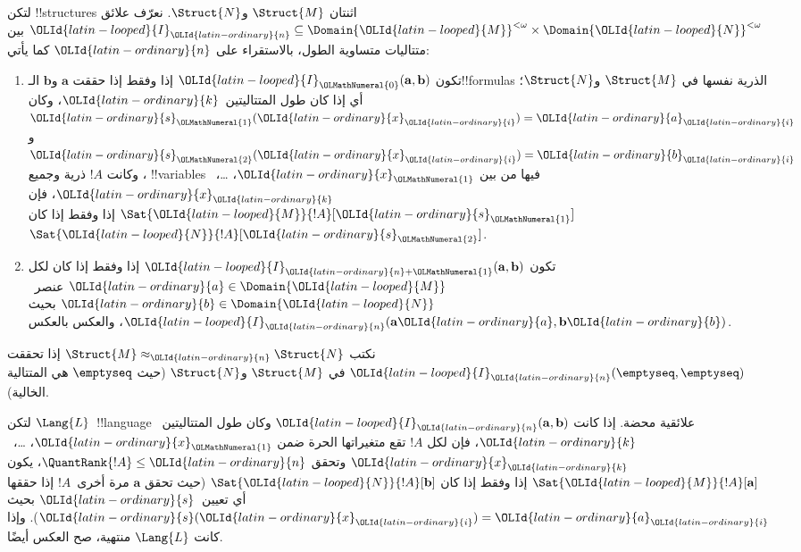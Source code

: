 \documentclass[../../../include/open-logic-section]{subfiles}
\begin{document}
\begin{defn}
  لتكن !!{structure}s اثنتان $\Struct{M}$ و$\Struct{N}$. نعرّف علائق
  ${\OLId{latin-looped}{I}}_{\OLId{latin-ordinary}{n}} \subseteq \Domain {\OLId{latin-looped}{M}}^{<\omega} \times \Domain {\OLId{latin-looped}{N}}^{<\omega}$ بين
  متتاليات متساوية الطول، بالاستقراء على ${\OLId{latin-ordinary}{n}}$ كما يأتي:
   \begin{enumerate}
   \item تكون ${\OLId{latin-looped}{I}}_{\OLMathNumeral{0}}(\mathbf{a},\mathbf{b})$ إذا وفقط إذا حققت
     $\mathbf{a}$ و$\mathbf{b}$ الـ!!{formula}s الذرية نفسها في
     $\Struct{M}$ و$\Struct{N}$؛ أي إذا كان طول المتتاليتين~${\OLId{latin-ordinary}{k}}$، وكان
     ${\OLId{latin-ordinary}{s}}_{\OLMathNumeral{1}}({\OLId{latin-ordinary}{x}}_{\OLId{latin-ordinary}{i}})={\OLId{latin-ordinary}{a}}_{\OLId{latin-ordinary}{i}}$ و${\OLId{latin-ordinary}{s}}_{\OLMathNumeral{2}}({\OLId{latin-ordinary}{x}}_{\OLId{latin-ordinary}{i}})={\OLId{latin-ordinary}{b}}_{\OLId{latin-ordinary}{i}}$، وكانت $!A$ ذرية وجميع
     !!{variable}s فيها من بين ${\OLId{latin-ordinary}{x}}_{\OLMathNumeral{1}}$، \dots،~${\OLId{latin-ordinary}{x}}_{\OLId{latin-ordinary}{k}}$، فإن
     $\Sat{{\OLId{latin-looped}{M}}}{!A}[{\OLId{latin-ordinary}{s}}_{\OLMathNumeral{1}}]$ إذا وفقط إذا كان $\Sat{{\OLId{latin-looped}{N}}}{!A}[{\OLId{latin-ordinary}{s}}_{\OLMathNumeral{2}}]$.
   \item تكون ${\OLId{latin-looped}{I}}_{{\OLId{latin-ordinary}{n}}+{\OLMathNumeral{1}}}(\mathbf{a},\mathbf{b})$ إذا وفقط إذا كان لكل
     ${\OLId{latin-ordinary}{a}}\in \Domain {\OLId{latin-looped}{M}}$ عنصر~${\OLId{latin-ordinary}{b}}\in \Domain {\OLId{latin-looped}{N}}$ بحيث
     ${\OLId{latin-looped}{I}}_{\OLId{latin-ordinary}{n}}(\mathbf{a}{\OLId{latin-ordinary}{a}},\mathbf{b}{\OLId{latin-ordinary}{b}})$، والعكس بالعكس.
   \end{enumerate}
\end{defn}


\begin{defn}
  نكتب $\Struct{M} \approx_{\OLId{latin-ordinary}{n}} \Struct{N}$ إذا تحققت
  ${\OLId{latin-looped}{I}}_{\OLId{latin-ordinary}{n}}(\emptyseq,\emptyseq)$ في $\Struct{M}$ و$\Struct{N}$ (حيث
  $\emptyseq$ هي المتتالية الخالية).
\end{defn}

\begin{thm}
  لتكن $\Lang{L}$~!!{language} علائقية محضة. إذا كانت
  ${\OLId{latin-looped}{I}}_{\OLId{latin-ordinary}{n}}(\mathbf{a},\mathbf{b})$ وكان طول المتتاليتين~${\OLId{latin-ordinary}{k}}$، فإن لكل $!A$
  تقع متغيراتها الحرة ضمن ${\OLId{latin-ordinary}{x}}_{\OLMathNumeral{1}}$، \dots،~${\OLId{latin-ordinary}{x}}_{\OLId{latin-ordinary}{k}}$ وتحقق
  $\QuantRank{!A} \le {\OLId{latin-ordinary}{n}}$، يكون $\Sat{{\OLId{latin-looped}{M}}}{!A}[\mathbf{a}]$ إذا وفقط إذا
  كان $\Sat{{\OLId{latin-looped}{N}}}{!A}[\mathbf{b}]$ (حيث تحقق $\mathbf{a}$ مرة أخرى~$!A$
  إذا حققها أي تعيين~${\OLId{latin-ordinary}{s}}$ بحيث ${\OLId{latin-ordinary}{s}}({\OLId{latin-ordinary}{x}}_{\OLId{latin-ordinary}{i}})={\OLId{latin-ordinary}{a}}_{\OLId{latin-ordinary}{i}}$). وإذا كانت $\Lang{L}$
  منتهية، صح العكس أيضًا.
\end{thm}
\end{document}
